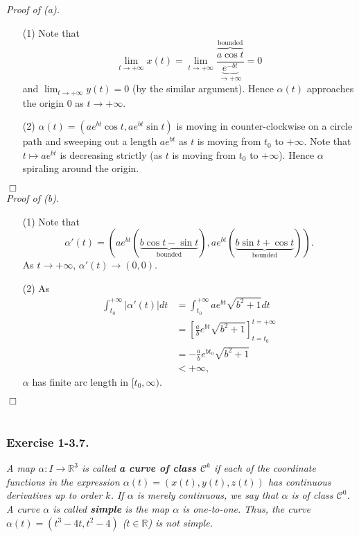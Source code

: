 \documentclass{article}
\begin{document}
\emph{Proof of (a).}
\begin{enumerate}
\item[(1)]
  Note that
  \[
    \lim_{t \to +\infty} x(t)
    = \lim_{t \to +\infty} \frac{\overbrace{a \cos t}^{\text{bounded}}}
      {\underbrace{e^{-bt}}_{\to +\infty}}
    = 0
  \]
  and $\lim_{t \to +\infty} y(t) = 0$ (by the similar argument).
  Hence $\alpha(t)$ approaches the origin $0$ as $t \to +\infty$.

\item[(2)]
  $\alpha(t) = (ae^{bt} \cos t, ae^{bt} \sin t)$
  is moving in counter-clockwise on a circle path and
  sweeping out a length $ae^{bt}$ as $t$ is moving from $t_0$ to $+\infty$.
  Note that $t \mapsto ae^{bt}$ is decreasing strictly (as $t$ is moving from $t_0$ to $+\infty$).
  Hence $\alpha$ spiraling around the origin.
\end{enumerate}
$\Box$ \\



\emph{Proof of (b).}
\begin{enumerate}
\item[(1)]
  Note that
  \[
    \alpha'(t)
    = ( ae^{bt} (\underbrace{b\cos t - \sin t}_{\text{bounded}}),
      ae^{bt} (\underbrace{b\sin t + \cos t}_{\text{bounded}}) ).
  \]
  As $t \to +\infty$, $\alpha'(t) \to (0,0)$.

\item[(2)]
  As
  \begin{align*}
    \int_{t_0}^{+\infty} |\alpha'(t)| dt
    &= \int_{t_0}^{+\infty} ae^{bt} \sqrt{b^2 + 1} dt \\
    &= \left[ \frac{a}{b} e^{bt} \sqrt{b^2 + 1} \right]_{t = t_0}^{t = +\infty} \\
    &= - \frac{a}{b} e^{bt_0} \sqrt{b^2 + 1} \\
    &< +\infty,
  \end{align*}
  $\alpha$ has finite arc length in $[t_0,\infty)$.
\end{enumerate}
$\Box$ \\\\






\subsubsection*{Exercise 1-3.7.}
\emph{A map $\alpha: I \to \mathbb{R}^3$ is called \textbf{a curve of class $\mathcal{C}^{k}$} if
each of the coordinate functions in the expression $\alpha(t) = (x(t), y(t), z(t))$
has continuous derivatives up to order $k$.
If $\alpha$ is merely continuous, we say that $\alpha$ is of class $\mathcal{C}^{0}$.
A curve $\alpha$ is called \textbf{simple} is the map $\alpha$ is one-to-one.
Thus, the curve $\alpha(t) = (t^3-4t, t^2-4)$ ($t \in \mathbb{R}$) is not simple.} \\
\end{document}
